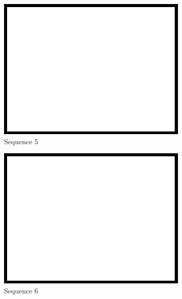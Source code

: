 \begin{figure}
\begin{subfigure}{0.49\columnwidth}
    \includegraphics[width=1.00\textwidth]{media/dummy.jpg}
    \caption{Sequence 5}
		\label{fig:datasets_5}
  \end{subfigure}
	\begin{subfigure}{0.49\columnwidth}
    \centering
    \includegraphics[width=1.00\textwidth]{media/dummy.jpg}
		\caption{Sequence 6}
		\label{fig:datasets_6}
  \end{subfigure} \vspace{10pt} \\ 
	\begin{subfigure}{0.49\columnwidth}
    \centering

\end{subfigure}
\end{figure}
